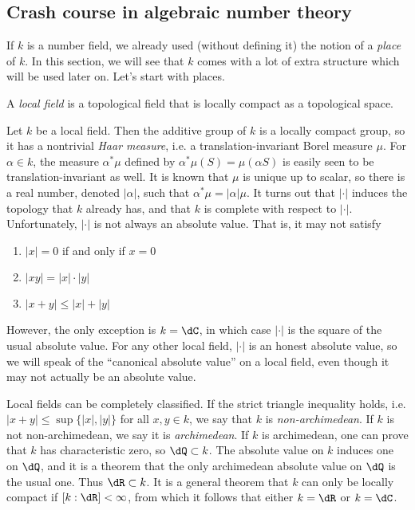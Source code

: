 \subsection{Crash course in algebraic number theory}

If $k$ is a number field, we already used (without defining it) the notion of a 
\emph{place} of $k$. In this section, we will see that $k$ comes with a lot of 
extra structure which will be used later on. Let's start with places. 

\begin{definition}
A \emph{local field} is a topological field that is locally compact as a 
topological space. 
\end{definition}

Let $k$ be a local field. Then the additive group of $k$ is a locally compact 
group, so it has a nontrivial \emph{Haar measure}, i.e. a 
translation-invariant Borel measure $\mu$. For $\alpha\in k$, the measure 
$\alpha^*\mu$ defined by $\alpha^* \mu(S) = \mu(\alpha S)$ is easily seen to 
be translation-invariant as well. It is known that $\mu$ is unique up to 
scalar, so there is a real number, denoted $|\alpha|$, such that 
$\alpha^*\mu = |\alpha|\mu$. It turns out that $|\cdot|$ induces the topology 
that $k$ already has, and that $k$ is complete with respect to $|\cdot|$. 
Unfortunately, $|\cdot|$ is not always an absolute value. That is, it may not 
satisfy 
\begin{enumerate}
  \item $|x|=0$ if and only if $x=0$
  \item $|x y| = |x|\cdot |y|$
  \item $|x+y|\leqslant |x|+|y|$
\end{enumerate}
However, the only exception is $k=\dC$, in which case $|\cdot |$ is the square 
of the usual absolute value. For any other local field, $|\cdot |$ is an honest 
absolute value, so we will speak of the ``canonical absolute value'' on a local 
field, even though it may not actually be an absolute value. 

Local fields can be completely classified. If the strict triangle inequality 
holds, i.e. $|x+y|\leqslant \sup\{|x|,|y|\}$ for all $x,y\in k$, we say that 
$k$ is \emph{non-archimedean}. If $k$ is not non-archimedean, we say it is 
\emph{archimedean}. If $k$ is archimedean, one can prove that $k$ has 
characteristic zero, so $\dQ\subset k$. The absolute value on $k$ induces one 
on $\dQ$, and it is a theorem that the only archimedean absolute value on 
$\dQ$ is the usual one. Thus $\dR\subset k$. It is a general theorem that $k$ 
can only be locally compact if $[k:\dR]<\infty$, from which it follows that 
either $k=\dR$ or $k=\dC$. 

